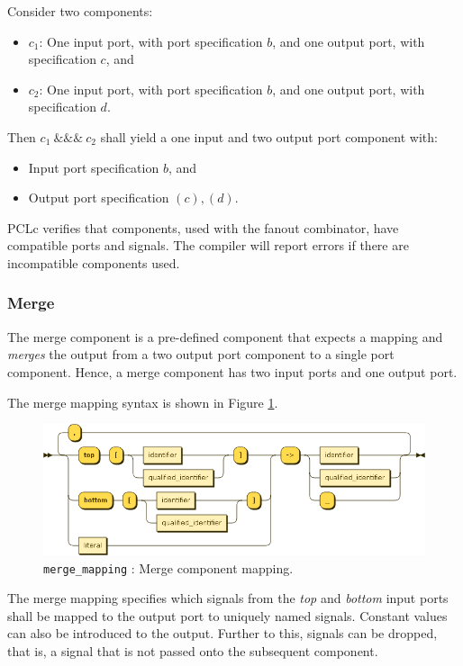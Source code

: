 Consider two components:
\begin{itemize}
\item $c_1$: One input port, with port specification $b$, and one output port, with specification $c$, and
\item $c_2$: One input port, with port specification $b$, and one output port, with specification $d$.
\end{itemize}
Then $c_1\ \&\&\&\ c_2$ shall yield a one input and two output port component with:
\begin{itemize}
\item Input port specification $b$, and
\item Output port specification $(c), (d)$.
\end{itemize}

PCLc verifies that components, used with the fanout combinator, have compatible ports and signals. The compiler will report errors if there are incompatible components used.

\subsubsection{Merge}\label{subsubsec:merge}
The merge component is a pre-defined component that expects a mapping and \emph{merges} the output from a two output port component to a single port component. Hence, a merge component has two input ports and one output port.

The merge mapping syntax is shown in Figure \ref{fig:pcl-merge-mapping}.
\begin{figure}[h!]
  \centering
    \includegraphics[scale=\DiagramScale,angle=90]{chapters/compiler/diagrams/merge_mapping}
  \caption{\texttt{merge\_mapping} : Merge component mapping.}
  \label{fig:pcl-merge-mapping}
\end{figure}
The merge mapping specifies which signals from the \emph{top} and \emph{bottom} input ports shall be mapped to the output port to uniquely named signals. Constant values can also be introduced to the output. Further to this, signals can be dropped, that is, a signal that is not passed onto the subsequent component.

